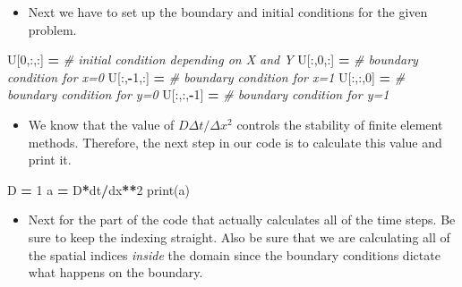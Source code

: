 \documentclass[
]{book}
\newenvironment{Shaded}{\begin{snugshade}}{\end{snugshade}}
\newcommand{\BuiltInTok}[1]{#1}
\newcommand{\CommentTok}[1]{\textcolor[rgb]{0.56,0.35,0.01}{\textit{#1}}}
\newcommand{\DecValTok}[1]{\textcolor[rgb]{0.00,0.00,0.81}{#1}}
\newcommand{\NormalTok}[1]{#1}
\newcommand{\OperatorTok}[1]{\textcolor[rgb]{0.81,0.36,0.00}{\textbf{#1}}}
\providecommand{\tightlist}{%
  \setlength{\itemsep}{0pt}\setlength{\parskip}{0pt}}
\theoremstyle{definition}
\theoremstyle{definition}
\theoremstyle{definition}
\theoremstyle{remark}
\begin{document}
\begin{itemize}
\tightlist
\item
  Next we have to set up the boundary and initial conditions for the given problem.
\end{itemize}

\begin{Shaded}
\begin{Highlighting}[]
\NormalTok{U[}\DecValTok{0}\NormalTok{,:,:] }\OperatorTok{=} \CommentTok{\# initial condition depending on X and Y}
\NormalTok{U[:,}\DecValTok{0}\NormalTok{,:] }\OperatorTok{=} \CommentTok{\# boundary condition for x=0}
\NormalTok{U[:,}\OperatorTok{{-}}\DecValTok{1}\NormalTok{,:] }\OperatorTok{=} \CommentTok{\# boundary condition for x=1}
\NormalTok{U[:,:,}\DecValTok{0}\NormalTok{] }\OperatorTok{=} \CommentTok{\# boundary condition for y=0}
\NormalTok{U[:,:,}\OperatorTok{{-}}\DecValTok{1}\NormalTok{] }\OperatorTok{=} \CommentTok{\# boundary condition for y=1}
\end{Highlighting}
\end{Shaded}

\begin{itemize}
\tightlist
\item
  We know that the value of \(D \Delta t / \Delta x^2\) controls the stability of finite element methods. Therefore, the next step in our code is to calculate this value and print it.
\end{itemize}

\begin{Shaded}
\begin{Highlighting}[]
\NormalTok{D }\OperatorTok{=} \DecValTok{1}
\NormalTok{a }\OperatorTok{=}\NormalTok{ D}\OperatorTok{*}\NormalTok{dt}\OperatorTok{/}\NormalTok{dx}\OperatorTok{**}\DecValTok{2}
\BuiltInTok{print}\NormalTok{(a)}
\end{Highlighting}
\end{Shaded}

\begin{itemize}
\tightlist
\item
  Next for the part of the code that actually calculates all of the time steps. Be sure to keep the indexing straight. Also be sure that we are calculating all of the spatial indices \emph{inside} the domain since the boundary conditions dictate what happens on the boundary.
\end{itemize}
\end{document}
